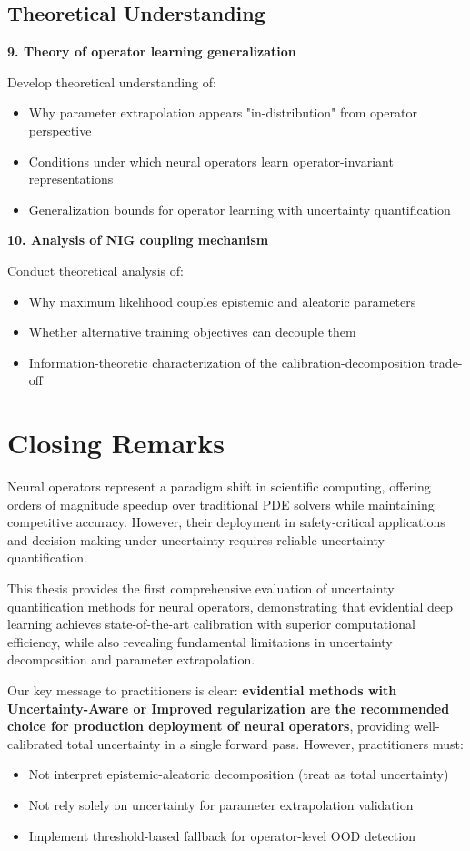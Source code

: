 \subsection{Theoretical Understanding}

\textbf{9. Theory of operator learning generalization}

Develop theoretical understanding of:
\begin{itemize}
\item Why parameter extrapolation appears "in-distribution" from operator perspective
\item Conditions under which neural operators learn operator-invariant representations
\item Generalization bounds for operator learning with uncertainty quantification
\end{itemize}

\textbf{10. Analysis of NIG coupling mechanism}

Conduct theoretical analysis of:
\begin{itemize}
\item Why maximum likelihood couples epistemic and aleatoric parameters
\item Whether alternative training objectives can decouple them
\item Information-theoretic characterization of the calibration-decomposition trade-off
\end{itemize}

\section{Closing Remarks}

Neural operators represent a paradigm shift in scientific computing, offering orders of magnitude speedup over traditional PDE solvers while maintaining competitive accuracy. However, their deployment in safety-critical applications and decision-making under uncertainty requires reliable uncertainty quantification.

This thesis provides the first comprehensive evaluation of uncertainty quantification methods for neural operators, demonstrating that evidential deep learning achieves state-of-the-art calibration with superior computational efficiency, while also revealing fundamental limitations in uncertainty decomposition and parameter extrapolation.

Our key message to practitioners is clear: \textbf{evidential methods with Uncertainty-Aware or Improved regularization are the recommended choice for production deployment of neural operators}, providing well-calibrated total uncertainty in a single forward pass. However, practitioners must:
\begin{itemize}
\item Not interpret epistemic-aleatoric decomposition (treat as total uncertainty)
\item Not rely solely on uncertainty for parameter extrapolation validation
\item Implement threshold-based fallback for operator-level OOD detection
\end{itemize}

